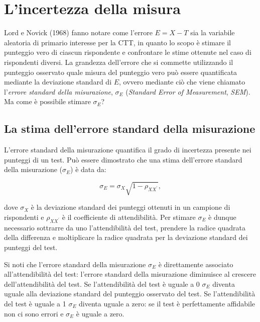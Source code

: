 \documentclass[
  11pt,
]{krantz}
\theoremstyle{definition}
\theoremstyle{definition}
\theoremstyle{definition}
\theoremstyle{definition}
\theoremstyle{remark}
\begin{document}
\hypertarget{ch:err_stnd_mis}{%
\chapter{L'incertezza della misura}\label{ch:err_stnd_mis}}

Lord e Novick (1968) fanno notare come l'errore \(E = X - T\) sia la variabile aleatoria di primario interesse per la CTT, in quanto lo scopo è stimare il punteggio vero di ciascun rispondente e confrontare le stime ottenute nel caso di rispondenti diversi. La grandezza dell'errore che si commette utilizzando il punteggio osservato quale misura del punteggio vero può essere quantificata mediante la deviazione standard di \(E\), ovvero mediante ciò che viene chiamato l'\emph{errore standard della misurazione}, \(\sigma_E\) (\emph{Standard Error of Measurement}, \emph{SEM}). Ma come è possibile stimare \(\sigma_E\)?

\hypertarget{la-stima-dellerrore-standard-della-misurazione}{%
\section{La stima dell'errore standard della misurazione}\label{la-stima-dellerrore-standard-della-misurazione}}

L'errore standard della misurazione quantifica il grado di incertezza presente nei punteggi di un test. Può essere dimostrato che una stima dell'errore standard della misurazione (\(\sigma_E\)) è data da:

\[
\sigma_E = \sigma_X \sqrt{1 -\rho_{XX^\prime}},
\label{eq:err-stnd-mis}
\]

dove \(\sigma_X\) è la deviazione standard dei punteggi ottenuti in un campione di rispondenti e \(\rho_{XX^\prime}\) è il coefficiente di attendibilità. Per stimare \(\sigma_E\) è dunque necessario sottrarre da uno l'attendibilità del test, prendere la radice quadrata della differenza e moltiplicare la radice quadrata per la deviazione standard dei punteggi del test.

Si noti che l'errore standard della misurazione \(\sigma_E\) è direttamente associato all'attendibilità del test: l'errore standard della misurazione diminuisce al crescere dell'attendibilità del test. Se l'attendibilità del test è uguale a 0 \(\sigma_E\) diventa uguale alla deviazione standard del punteggio osservato del test. Se l'attendibilità del test è uguale a 1 \(\sigma_E\) diventa uguale a zero: se il test è perfettamente affidabile non ci sono errori e \(\sigma_E\) è uguale a zero.
\end{document}
